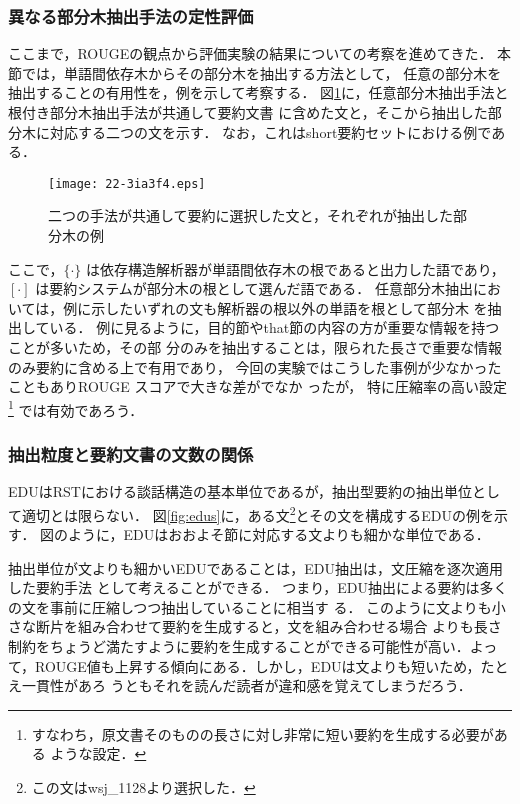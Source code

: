 \documentclass[japanese]{jnlp_1.4}
\begin{document}
\subsubsection{異なる部分木抽出手法の定性評価}
\label{sec:subtree}

ここまで，ROUGEの観点から評価実験の結果についての考察を進めてきた．
本節では，単語間依存木からその部分木を抽出する方法として，
任意の部分木を抽出することの有用性を，例を示して考察する．
図\ref{fig:sents}に，任意部分木抽出手法と根付き部分木抽出手法が共通して要約文書
に含めた文と，そこから抽出した部分木に対応する二つの文を示す．
なお，これはshort要約セットにおける例である．

\begin{figure}[b]
\begin{center}
\texttt{[image: 22-3ia3f4.eps]}
\end{center}
\caption{二つの手法が共通して要約に選択した文と，それぞれが抽出した部分木の例}
\label{fig:sents}
\end{figure}

ここで，$\{\cdot\}$ は依存構造解析器が単語間依存木の根であると出力した語であり，
$[\cdot]$ は要約システムが部分木の根として選んだ語である．
任意部分木抽出においては，例に示したいずれの文も解析器の根以外の単語を根として部分木
を抽出している．
例に見るように，目的節やthat節の内容の方が重要な情報を持つことが多いため，その部
分のみを抽出することは，限られた長さで重要な情報のみ要約に含める上で有用であり，
今回の実験ではこうした事例が少なかったこともありROUGE スコアで大きな差がでなか
ったが，
特に圧縮率の高い設定
\footnote{すなわち，原文書そのものの長さに対し非常に短い要約を生成する必要がある
ような設定．}
では有効であろう．


\subsubsection{抽出粒度と要約文書の文数の関係}
\label{sec:unit}

EDUはRSTにおける談話構造の基本単位であるが，抽出型要約の抽出単位として適切とは限らない．
図\ref{fig:edus}に，ある文\footnote{この文はwsj\_1128より選択した．}とその文を構成するEDUの例を示す．
図のように，EDUはおおよそ節に対応する文よりも細かな単位である．

抽出単位が文よりも細かいEDUであることは，EDU抽出は，文圧縮を逐次適用した要約手法
として考えることができる．
つまり，EDU抽出による要約は多くの文を事前に圧縮しつつ抽出していることに相当す
る．
このように文よりも小さな断片を組み合わせて要約を生成すると，文を組み合わせる場合
よりも長さ制約をちょうど満たすように要約を生成することができる可能性が高い．よっ
て，ROUGE値も上昇する傾向にある．しかし，EDUは文よりも短いため，たとえ一貫性があろ
うともそれを読んだ読者が違和感を覚えてしまうだろう．
\end{document}
